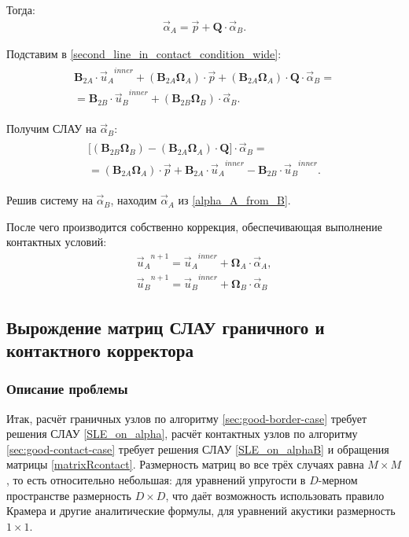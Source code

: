 \documentclass[a4paper]{article}
\numberwithin{equation}{section}
\begin{document}
Тогда:
\begin{eqnarray}
\label{alpha_A_from_B}
\vec{\alpha}_A = \vec{p} + \mathbf{Q} \cdot \vec{\alpha}_B.
\end{eqnarray}

Подставим в \eqref{second_line_in_contact_condition_wide}:
\begin{eqnarray}
\begin{split}
\mathbf{B}_{2A} \cdot {\vec{u}_A}^{inner} + (\mathbf{B}_{2A} \mathbf{\Omega}_A) \cdot \vec{p} + (\mathbf{B}_{2A} \mathbf{\Omega}_A) \cdot \mathbf{Q} \cdot \vec{\alpha}_B = \\ =
\mathbf{B}_{2B} \cdot {\vec{u}_B}^{inner} + (\mathbf{B}_{2B} \mathbf{\Omega}_B) \cdot \vec{\alpha}_B.
\end{split}
\end{eqnarray}

Получим СЛАУ на $\vec{\alpha}_B$:
\begin{eqnarray}
\label{SLE_on_alphaB}
\begin{split}
\Bigg[  (\mathbf{B}_{2B} \mathbf{\Omega}_B) - (\mathbf{B}_{2A} \mathbf{\Omega}_A) \cdot \mathbf{Q}  \Bigg] \cdot \vec{\alpha}_B = \\ = 
(\mathbf{B}_{2A} \mathbf{\Omega}_A) \cdot \vec{p} + \mathbf{B}_{2A} \cdot {\vec{u}_A}^{inner} - \mathbf{B}_{2B} \cdot {\vec{u}_B}^{inner}.
\end{split}
\end{eqnarray}

Решив систему на $\vec{\alpha}_B$, находим $\vec{\alpha}_A$ из \eqref{alpha_A_from_B}.

После чего производится собственно коррекция, обеспечивающая выполнение контактных условий:
\begin{eqnarray}
{\vec{u}_A}^{n+1} = {\vec{u}_A}^{inner} + \mathbf{\Omega}_A \cdot \vec{\alpha}_A, \\
{\vec{u}_B}^{n+1} = {\vec{u}_B}^{inner} + \mathbf{\Omega}_B \cdot \vec{\alpha}_B
\end{eqnarray}


\subsection{Вырождение матриц СЛАУ граничного и контактного корректора}
\subsubsection{Описание проблемы}
\label{degeneration_problem}
Итак, расчёт граничных узлов по алгоритму \ref{sec:good-border-case} 
требует решения СЛАУ \ref{SLE_on_alpha}, 
расчёт контактных узлов по алгоритму \ref{sec:good-contact-case} требует 
решения СЛАУ \ref{SLE_on_alphaB} и обращения матрицы \ref{matrixRcontact}.
Размерность матриц во все трёх случаях равна $M \times M$, 
то есть относительно небольшая: для уравнений упругости в $D$-мерном 
пространстве размерность $D \times D$, что даёт возможность 
использовать правило Крамера и другие аналитические формулы, 
для уравнений акустики размерность $1 \times 1$. 
\end{document}
